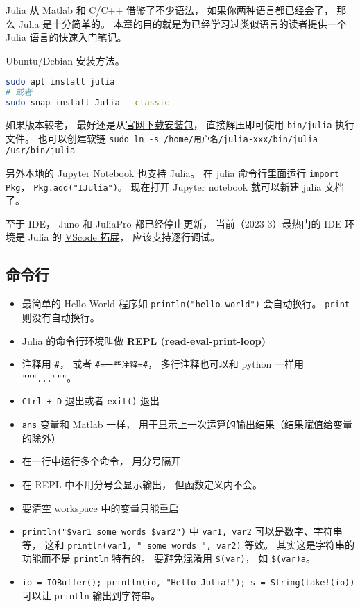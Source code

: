 
Julia 从 Matlab 和 C/C++ 借鉴了不少语法， 如果你两种语言都已经会了， 那么 Julia 是十分简单的。 本章的目的就是为已经学习过类似语言的读者提供一个 Julia 语言的快速入门笔记。

Ubuntu/Debian 安装方法。
\begin{lstlisting}[language=bash]
sudo apt install julia
# 或者
sudo snap install Julia --classic
\end{lstlisting}
如果版本较老， 最好还是从\href{https://julialang.org/downloads}{官网下载安装包}， 直接解压即可使用 \verb`bin/julia` 执行文件。 也可以创建软链 \verb`sudo ln -s /home/用户名/julia-xxx/bin/julia /usr/bin/julia`

另外本地的 Jupyter Notebook 也支持 Julia。 在 julia 命令行里面运行 \verb`import Pkg`， \verb`Pkg.add("IJulia")`。 现在打开 Jupyter notebook 就可以新建 julia 文档了。

至于 IDE， Juno 和 JuliaPro 都已经停止更新， 当前（2023-3）最热门的 IDE 环境是 Julia 的 \href{https://www.julia-vscode.org}{VScode 拓展}， 应该支持逐行调试。

\subsection{命令行}
\begin{itemize}
\item 最简单的 Hello World 程序如 \verb`println("hello world")` 会自动换行。 \verb`print` 则没有自动换行。
\item Julia 的命令行环境叫做 \textbf{REPL (read-eval-print-loop)}
\item 注释用 \verb`#`， 或者 \verb`#=一些注释=#`， 多行注释也可以和 python 一样用 \verb`"""..."""`。
\item \verb`Ctrl + D` 退出或者 \verb`exit()` 退出
\item \verb`ans` 变量和 Matlab 一样， 用于显示上一次运算的输出结果（结果赋值给变量的除外）
\item 在一行中运行多个命令， 用分号隔开
\item 在 REPL 中不用分号会显示输出， 但函数定义内不会。
\item 要清空 workspace 中的变量只能重启
\item \verb`println("$var1 some words $var2")` 中 \verb`var1, var2` 可以是数字、字符串等， 这和 \verb`println(var1, " some words ", var2)` 等效。 其实这是字符串的功能而不是 \verb`println` 特有的。 要避免混淆用 \verb`$(var)`， 如 \verb`$(var)a`。
\item \verb`io = IOBuffer(); println(io, "Hello Julia!"); s = String(take!(io))` 可以让 \verb`println` 输出到字符串。
\end{itemize}

